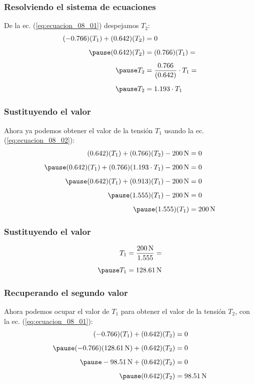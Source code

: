 \documentclass[12pt]{beamer}
\begin{document}
\begin{frame}
\frametitle{Resolviendo el sistema de ecuaciones}
De la ec. (\ref{eq:ecuacion_08_01}) despejamos $T_{2}$:
\pause
\begin{eqnarray*}
\begin{aligned}
(-0.766)(T_{1}) + (0.642)(T_{2}) &= 0 \\[0.5em] \pause
(0.642)(T_{2}) &= (0.766)(T_{1}) = \\[0.5em] \pause
T_{2} &= \dfrac{0.766}{(0.642)} \cdot T_{1} = \\[0.5em] \pause
T_{2} &= 1.193 \cdot T_{1}
\end{aligned}
\end{eqnarray*}
\end{frame}
\begin{frame}
\frametitle{Sustituyendo el valor}
Ahora ya podemos obtener el valor de la tensión $T_{1}$ usando la ec. (\ref{eq:ecuacion_08_02}):
\pause
\begin{eqnarray*}
\begin{aligned}
(0.642)(T_{1}) + (0.766)(T_{2}) - \SI{200}{\newton} &= 0 \\[0.5em] \pause
(0.642)(T_{1}) + (0.766)(1.193 \cdot T_{1}) - \SI{200}{\newton} &= 0 \\[0.5em] \pause
(0.642)(T_{1}) + (0.913)(T_{1}) - \SI{200}{\newton} &= 0 \\[0.5em] \pause
(1.555)(T_{1}) - \SI{200}{\newton} &= 0 \\[0.5em] \pause
(1.555)(T_{1}) &= \SI{200}{\newton}
\end{aligned}
\end{eqnarray*}
\end{frame}
\begin{frame}
\frametitle{Sustituyendo el valor}
\begin{eqnarray*}
\begin{aligned}
T_{1} &= \dfrac{\SI{200}{\newton}}{1.555} = \\[0.5em] \pause
T_{1} &= \SI{128.61}{\newton}
\end{aligned}
\end{eqnarray*}
\end{frame}
\begin{frame}
\frametitle{Recuperando el segundo valor}
Ahora podemos ocupar el valor de $T_{1}$ para obtener el valor de la tensión $T_{2}$, con la ec. (\ref{eq:ecuacion_08_01}):
\pause
\begin{eqnarray*}
\begin{aligned}
(-0.766)(T_{1}) + (0.642)(T_{2}) &= 0 \\[0.5em] \pause
(-0.766)(\SI{128.61}{\newton}) + (0.642)(T_{2}) &= 0 \\[0.5em] \pause
- \SI{98.51}{\newton} + (0.642)(T_{2}) &= 0 \\[0.5em] \pause
(0.642)(T_{2}) &= \SI{98.51}{\newton}
\end{aligned}
\end{eqnarray*}
\end{frame}
\end{document}
